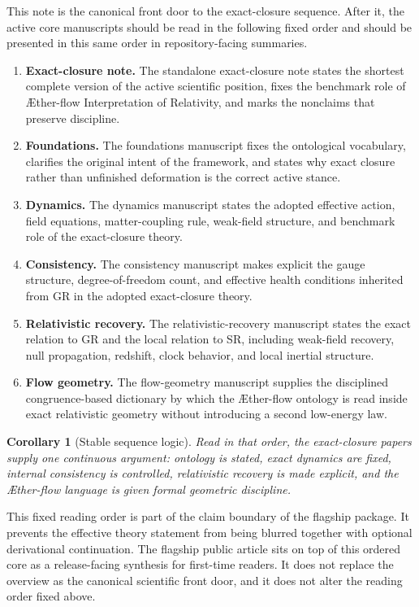 \documentclass[11pt]{article}
\newcommand{\Aflow}{\AE{}ther-flow}
\newcommand{\TheoryName}{\Aflow{} Interpretation of Relativity}
\newtheorem{corollary}{Corollary}
\begin{document}
This note is the canonical front door to the exact-closure sequence. After it, the active core manuscripts should be read in the following fixed order and should be presented in this same order in repository-facing summaries.
\begin{enumerate}
    \item \textbf{Exact-closure note.} The standalone exact-closure note states the shortest complete version of the active scientific position, fixes the benchmark role of \TheoryName{}, and marks the nonclaims that preserve discipline.
    \item \textbf{Foundations.} The foundations manuscript fixes the ontological vocabulary, clarifies the original intent of the framework, and states why exact closure rather than unfinished deformation is the correct active stance.
    \item \textbf{Dynamics.} The dynamics manuscript states the adopted effective action, field equations, matter-coupling rule, weak-field structure, and benchmark role of the exact-closure theory.
    \item \textbf{Consistency.} The consistency manuscript makes explicit the gauge structure, degree-of-freedom count, and effective health conditions inherited from GR in the adopted exact-closure theory.
    \item \textbf{Relativistic recovery.} The relativistic-recovery manuscript states the exact relation to GR and the local relation to SR, including weak-field recovery, null propagation, redshift, clock behavior, and local inertial structure.
    \item \textbf{Flow geometry.} The flow-geometry manuscript supplies the disciplined congruence-based dictionary by which the \Aflow{} ontology is read inside exact relativistic geometry without introducing a second low-energy law.
\end{enumerate}

\begin{corollary}[Stable sequence logic]
Read in that order, the exact-closure papers supply one continuous argument: ontology is stated, exact dynamics are fixed, internal consistency is controlled, relativistic recovery is made explicit, and the \Aflow{} language is given formal geometric discipline.
\end{corollary}

This fixed reading order is part of the claim boundary of the flagship package. It prevents the effective theory statement from being blurred together with optional derivational continuation.
The flagship public article sits on top of this ordered core as a release-facing synthesis for first-time readers. It does not replace the overview as the canonical scientific front door, and it does not alter the reading order fixed above.
\end{document}
